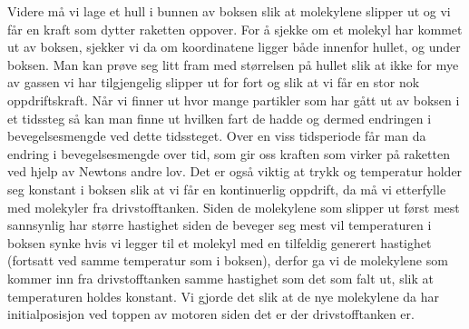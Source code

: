 \documentclass[reprint,english,notitlepage]{revtex4-1}
\begin{document}
	Videre må vi lage et hull i bunnen av boksen slik at molekylene slipper ut og
	vi får en kraft som dytter raketten oppover. For å sjekke om et molekyl har kommet
	ut av boksen, sjekker vi da om koordinatene ligger både innenfor hullet, og under boksen.
  Man kan prøve seg litt fram med størrelsen på hullet slik at ikke for mye av gassen
	vi har tilgjengelig slipper ut for fort og slik at vi får en stor nok oppdriftskraft.
	Når vi finner ut hvor mange partikler som har gått ut av boksen i et tidssteg
	så kan man finne ut hvilken fart de hadde og dermed endringen i bevegelsesmengde
	ved dette tidssteget. Over en viss tidsperiode får man da endring i bevegelsesmengde over tid,
	som gir oss kraften som virker på raketten ved hjelp
	av Newtons andre lov. Det er også viktig at trykk og temperatur holder seg konstant
	i boksen slik at vi får en kontinuerlig oppdrift, da må vi etterfylle med molekyler
	fra drivstofftanken. Siden de molekylene som slipper ut først mest sannsynlig har
	større hastighet siden de beveger seg mest vil temperaturen i boksen synke hvis
	vi legger til et molekyl med en tilfeldig generert hastighet (fortsatt ved samme
  temperatur som i boksen), derfor ga vi de molekylene som kommer inn fra drivstofftanken
	samme hastighet som det som falt ut, slik at temperaturen holdes konstant. Vi gjorde det slik at de nye
	molekylene da har initialposisjon ved toppen av motoren siden det er der drivstofftanken er.
\end{document}
